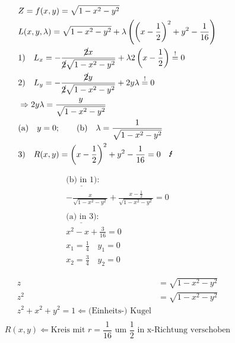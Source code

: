 \begin{align*}
	 & Z = f(x, y) = \sqrt{1 - x^2 - y^2}                                                                                               \\
	 & L(x, y, \lambda) = \sqrt{1 - x^2 - y^2} + \lambda \left( {\left( x - \frac{1}{2} \right)}^2 + y^2 - \frac{1}{16} \right)         \\
	 & 1)\quad L_x = - \frac{\cancel{2} x}{\cancel{2} \sqrt{1 - x^2 - y^2}} + \lambda 2 \left( x - \frac{1}{2} \right) \overset{!}{=} 0 \\
	 & 2)\quad L_y = - \frac{\cancel{2} y}{\cancel{2} \sqrt{1 - x^2 - y^2}} + 2 y \lambda \overset{!}{=} 0                              \\
	 & \Rightarrow 2 y \lambda = \frac{y}{\sqrt{1 - x^2 - y^2}}                                                                         \\
	 & \text{(a)} \quad y = 0;\qquad \text{(b)} \quad \lambda = \frac{1}{\sqrt{1 - x^2 - y^2}}                                          \\
	 & 3)\quad R(x, y) = {\left( x - \frac{1}{2} \right)}^2 + y^2 - \frac{1}{16} = 0 \quad \text{\Lightning}
\end{align*}

\begin{align*}
	\underline{\text{(b) in } 1)}:                                                      \\
	- \frac{x}{\sqrt{1 - x^2 - y^2}} + \frac{x - \frac{1}{2}}{\sqrt{1 - x^2 - y^2}} = 0 \\ %
	\\
	\underline{\text{(a) in } 3)}:                                                      \\
	x^2 - x + \frac{3}{16} = 0                                                          \\
	x_1 = \frac{1}{4} \quad y_1 = 0                                                     \\
	x_2 = \frac{3}{4} \quad y_2 = 0
\end{align*}

\begin{align*}
	z   & = \sqrt{1 - x^2 - y^2}                            \\
	z^2 & = \sqrt{1 - x^2 - y^2}                            \\
	z^2 + x^2 + y^2 = 1 \Leftarrow \text{(Einheits-) Kugel} \\
\end{align*}
\[
	R(x,y) \Leftarrow \text{Kreis mit } r = \frac{1}{16} \text{ um } \frac{1}{2} \text{ in x-Richtung verschoben}
\]


